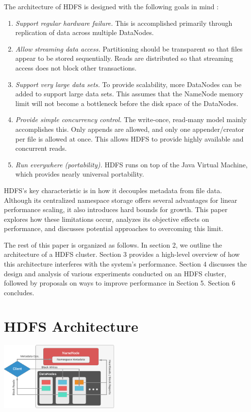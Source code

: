 \documentclass[11pt, a4paper]{article}
\begin{document}
\begin{multicols*}{2}
The architecture of HDFS is designed with the following goals in mind \cite{HdfsGuide}:
\begin{enumerate}[noitemsep, label=\arabic*.]
	\item\textit{Support regular hardware failure.} This is accomplished primarily through replication of data across multiple DataNodes.
	\item\textit{Allow streaming data access.} Partitioning should be transparent so that files appear to be stored sequentially. Reads are distributed so that streaming access does not block other transactions.
	\item\textit{Support very large data sets.} To provide scalability, more DataNodes can be added to support large data sets. This assumes that the NameNode memory limit will not become a bottleneck before the disk space of the DataNodes.
	\item\textit{Provide simple concurrency control.} The write-once, read-many model mainly accomplishes this. Only appends are allowed, and only one appender/creator per file is allowed at once. This allows HDFS to provide highly available and concurrent reads.
	\item\textit{Run everywhere (portability).} HDFS runs on top of the Java Virtual Machine, which provides nearly universal portability.
\end{enumerate}

HDFS's key characteristic is in how it decouples metadata from file data. Although its centralized namespace storage offers several advantages for linear performance scaling, it also introduces hard bounds for growth. This paper explores how these limitations occur, analyzes its objective effects on performance, and discusses potential approaches to overcoming this limit.

The rest of this paper is organized as follows. In section 2, we outline the architecture of a HDFS cluster. Section 3 provides a high-level overview of how this architecture interferes with the system's performance. Section 4 discusses the design and analysis of various experiments conducted on an HDFS cluster, followed by proposals on ways to improve performance in Section 5. Section 6 concludes.

\section{HDFS Architecture}
\begin{center}
	\includegraphics[keepaspectratio=true, width=0.45\textwidth]{Architecture}
\end{center}


\end{multicols*}
\end{document}
